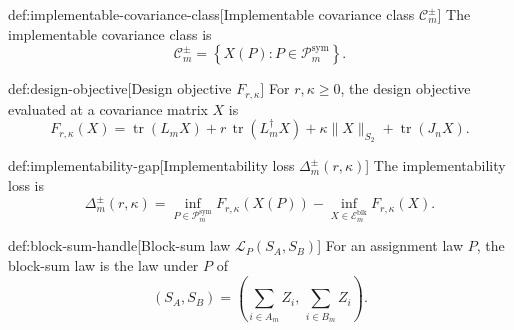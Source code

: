 \begin{definitionv}{def:implementable-covariance-class}[Implementable covariance class $\mathcal C_m^{\pm}$]
The implementable covariance class is
\[
\mathcal C_m^{\pm}
=
\left\{
X(P): P\in \mathcal P_m^{\mathrm{sym}}
\right\}.
\]
\end{definitionv}

\begin{definitionv}{def:design-objective}[Design objective $F_{r,\kappa}$]
For $r,\kappa\ge 0$, the design objective evaluated at a covariance matrix $X$ is
\[
F_{r,\kappa}(X)
=
\operatorname{tr}(L_m X)
+
r\,\operatorname{tr}(L_m^\dagger X)
+
\kappa \|X\|_{S_2}
+
\operatorname{tr}(J_n X).
\]
\end{definitionv}

\begin{definitionv}{def:implementability-gap}[Implementability loss $\Delta_m^{\pm}(r,\kappa)$]
The implementability loss is
\[
\Delta_m^{\pm}(r,\kappa)
=
\inf_{P\in \mathcal P_m^{\mathrm{sym}}}
F_{r,\kappa}(X(P))
-
\inf_{X\in \mathcal E_m^{\mathrm{blk}}}
F_{r,\kappa}(X).
\]
\end{definitionv}

\begin{definitionv}{def:block-sum-handle}[Block-sum law $\mathcal L_P(S_A,S_B)$]
For an assignment law $P$, the block-sum law is the law under $P$ of
\[
(S_A,S_B)
=
\left(
\sum_{i\in A_m} Z_i,\,
\sum_{i\in B_m} Z_i
\right).
\]
\end{definitionv}

